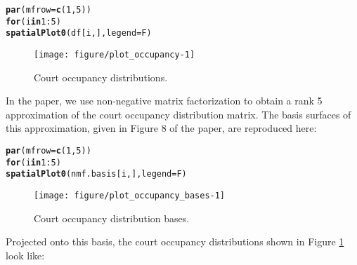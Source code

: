 \documentclass{article}\usepackage[]{graphicx}\usepackage[]{color}
\makeatletter
\def\maxwidth{ %
  \ifdim\Gin@nat@width>\linewidth
    \linewidth
  \else
    \Gin@nat@width
  \fi
}
\newcommand{\hlnum}[1]{\textcolor[rgb]{0.686,0.059,0.569}{#1}}%
\newcommand{\hlopt}[1]{\textcolor[rgb]{0,0,0}{#1}}%
\newcommand{\hlstd}[1]{\textcolor[rgb]{0.345,0.345,0.345}{#1}}%
\newcommand{\hlkwa}[1]{\textcolor[rgb]{0.161,0.373,0.58}{\textbf{#1}}}%
\newcommand{\hlkwc}[1]{\textcolor[rgb]{0.333,0.667,0.333}{#1}}%
\newcommand{\hlkwd}[1]{\textcolor[rgb]{0.737,0.353,0.396}{\textbf{#1}}}%
\newenvironment{kframe}{%
 \def\at@end@of@kframe{}%
 \ifinner\ifhmode%
  \def\at@end@of@kframe{\end{minipage}}%
  \begin{minipage}{\columnwidth}%
 \fi\fi%
 \def\FrameCommand##1{\hskip\@totalleftmargin \hskip-\fboxsep
 \colorbox{shadecolor}{##1}\hskip-\fboxsep
     \hskip-\linewidth \hskip-\@totalleftmargin \hskip\columnwidth}%
 \MakeFramed {\advance\hsize-\width
   \@totalleftmargin\z@ \linewidth\hsize
   \@setminipage}}%
 {\par\unskip\endMakeFramed%
 \at@end@of@kframe}
\newenvironment{knitrout}{}{} %
\makeatother
\begin{document}
\begin{knitrout}\footnotesize
{}\color{fgcolor}\begin{kframe}
\begin{alltt}
\hlkwd{par}\hlstd{(}\hlkwc{mfrow}\hlstd{=}\hlkwd{c}\hlstd{(}\hlnum{1}\hlstd{,}\hlnum{5}\hlstd{))}
\hlkwa{for}\hlstd{(i} \hlkwa{in} \hlnum{1}\hlopt{:}\hlnum{5}\hlstd{)}
  \hlkwd{spatialPlot0}\hlstd{(df[i, ],} \hlkwc{legend}\hlstd{=F)}
\end{alltt}
\end{kframe}\begin{figure}[H]

{\centering \texttt{[image: figure/plot\_occupancy-1]} 

}

\caption[Court occupancy distributions]{Court occupancy distributions.}\label{fig:plot_occupancy}
\end{figure}


\end{knitrout}

In the paper, we use non-negative matrix factorization to obtain a rank 5 approximation of the court occupancy distribution matrix. The basis surfaces of this approximation, given in Figure 8 of the paper, are reproduced here:

\begin{knitrout}\footnotesize
{}\color{fgcolor}\begin{kframe}
\begin{alltt}
\hlkwd{par}\hlstd{(}\hlkwc{mfrow}\hlstd{=}\hlkwd{c}\hlstd{(}\hlnum{1}\hlstd{,}\hlnum{5}\hlstd{))}
\hlkwa{for}\hlstd{(i} \hlkwa{in} \hlnum{1}\hlopt{:}\hlnum{5}\hlstd{)}
  \hlkwd{spatialPlot0}\hlstd{(nmf.basis[i, ],} \hlkwc{legend}\hlstd{=F)}
\end{alltt}
\end{kframe}\begin{figure}[H]

{\centering \texttt{[image: figure/plot\_occupancy\_bases-1]} 

}

\caption[Court occupancy distribution bases]{Court occupancy distribution bases.}\label{fig:plot_occupancy_bases}
\end{figure}


\end{knitrout}

Projected onto this basis, the court occupancy distributions shown in Figure \ref{fig:plot_occupancy} look like:
\end{document}
